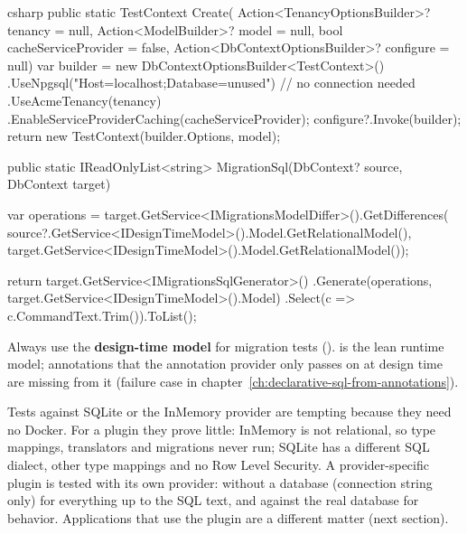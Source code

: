 \begin{sourcecode}{csharp}
public static TestContext Create(
    Action<TenancyOptionsBuilder>? tenancy = null,
    Action<ModelBuilder>? model = null,
    bool cacheServiceProvider = false,
    Action<DbContextOptionsBuilder>? configure = null)
{
    var builder = new DbContextOptionsBuilder<TestContext>()
        .UseNpgsql("Host=localhost;Database=unused")       // no connection needed
        .UseAcmeTenancy(tenancy)
        .EnableServiceProviderCaching(cacheServiceProvider);
    configure?.Invoke(builder);
    return new TestContext(builder.Options, model);
}

public static IReadOnlyList<string> MigrationSql(DbContext? source, DbContext target)
{
    var operations = target.GetService<IMigrationsModelDiffer>().GetDifferences(
        source?.GetService<IDesignTimeModel>().Model.GetRelationalModel(),
        target.GetService<IDesignTimeModel>().Model.GetRelationalModel());

    return target.GetService<IMigrationsSqlGenerator>()
        .Generate(operations, target.GetService<IDesignTimeModel>().Model)
        .Select(c => c.CommandText.Trim()).ToList();
}
\end{sourcecode}

\begin{important}
  Always use the \textbf{design-time model} for migration tests
  ().  is
  the lean runtime model; annotations that the annotation provider only passes on at design
  time are missing from it (failure case in
  chapter~\ref{ch:declarative-sql-from-annotations}).
\end{important}

\begin{note}
  Tests against SQLite or the InMemory provider are tempting because they need no Docker.
  For a plugin they prove little: InMemory is not relational, so type mappings, translators
  and migrations never run; SQLite has a different SQL dialect, other type mappings and no
  Row Level Security. A provider-specific plugin is tested with its own provider: without a
  database (connection string only) for everything up to the SQL text, and against the real
  database for behavior. Applications that use the plugin are a different matter (next
  section).
\end{note}

